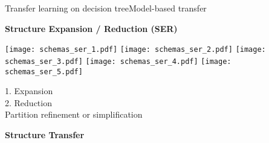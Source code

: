 \begin{frame}{Transfer learning on decision tree}{Model-based transfer}
\begin{minipage}[t]{0.49\linewidth}
    \vspace{0pt}
    \centering
    \textbf{Structure Expansion / Reduction (SER)}
    
    \renewcommand{\ratio}{0.65}
    \begin{overprint}
        \texttt{[image: schemas\_ser\_1.pdf]}
        \texttt{[image: schemas\_ser\_2.pdf]}
        \texttt{[image: schemas\_ser\_3.pdf]}
        \texttt{[image: schemas\_ser\_4.pdf]}
        \texttt{[image: schemas\_ser\_5.pdf]}
    \end{overprint}
    
    \textcolor{myblue}{1. Expansion}\\
    \textcolor{myorange}{2. Reduction}\\
    Partition refinement or simplification

\end{minipage}\hfill
\begin{minipage}[t]{0.49\linewidth}
    \vspace{0pt}
    \centering
    \textbf{Structure Transfer}
    

\end{minipage}
\end{frame}
